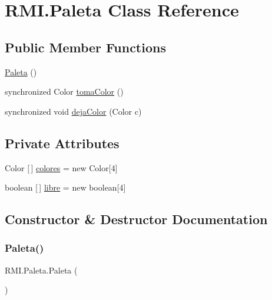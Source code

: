 \hypertarget{class_r_m_i_1_1_paleta}{}\section{R\+M\+I.\+Paleta Class Reference}
\label{class_r_m_i_1_1_paleta}
\subsection*{Public Member Functions}
\begin{DoxyCompactItemize}
\item 
\mbox{\hyperlink{class_r_m_i_1_1_paleta_aaba6547b5c77099c845a10d937e064e6}{Paleta}} ()
\item 
synchronized Color \mbox{\hyperlink{class_r_m_i_1_1_paleta_a3d33527acb560a081844fdbce4e29195}{toma\+Color}} ()
\item 
synchronized void \mbox{\hyperlink{class_r_m_i_1_1_paleta_aece560f1c69d6f05c612dc7d60a06aaf}{deja\+Color}} (Color c)
\end{DoxyCompactItemize}
\subsection*{Private Attributes}
\begin{DoxyCompactItemize}
\item 
Color \mbox{[}$\,$\mbox{]} \mbox{\hyperlink{class_r_m_i_1_1_paleta_af04daaaad9a19f36a9274f916f450b5a}{colores}} = new Color\mbox{[}4\mbox{]}
\item 
boolean \mbox{[}$\,$\mbox{]} \mbox{\hyperlink{class_r_m_i_1_1_paleta_a4b1b7b3121f983b09dfc9daf91620bad}{libre}} = new boolean\mbox{[}4\mbox{]}
\end{DoxyCompactItemize}


\subsection{Constructor \& Destructor Documentation}
\mbox{\label{class_r_m_i_1_1_paleta_aaba6547b5c77099c845a10d937e064e6}} 
\subsubsection{\texorpdfstring{Paleta()}{Paleta()}}
{\footnotesize\ttfamily R\+M\+I.\+Paleta.\+Paleta (\begin{DoxyParamCaption}{ }\end{DoxyParamCaption})\hspace{0.3cm}{\ttfamily [inline]}}


